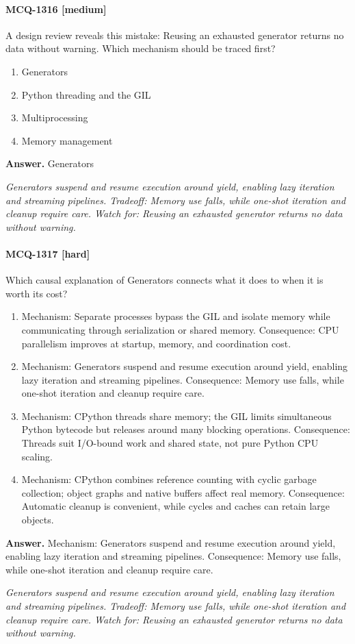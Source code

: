 \paragraph{MCQ-1316 [medium]} A design review reveals this mistake: Reusing an exhausted generator returns no data without warning. Which mechanism should be traced first?
\begin{enumerate}[label=\Alph*.]
\item Generators
\item Python threading and the GIL
\item Multiprocessing
\item Memory management
\end{enumerate}
\noindent\textbf{Answer.} Generators
\par\textit{Generators suspend and resume execution around yield, enabling lazy iteration and streaming pipelines. Tradeoff: Memory use falls, while one-shot iteration and cleanup require care. Watch for: Reusing an exhausted generator returns no data without warning.}
\paragraph{MCQ-1317 [hard]} Which causal explanation of Generators connects what it does to when it is worth its cost?
\begin{enumerate}[label=\Alph*.]
\item Mechanism: Separate processes bypass the GIL and isolate memory while communicating through serialization or shared memory. Consequence: CPU parallelism improves at startup, memory, and coordination cost.
\item Mechanism: Generators suspend and resume execution around yield, enabling lazy iteration and streaming pipelines. Consequence: Memory use falls, while one-shot iteration and cleanup require care.
\item Mechanism: CPython threads share memory; the GIL limits simultaneous Python bytecode but releases around many blocking operations. Consequence: Threads suit I/O-bound work and shared state, not pure Python CPU scaling.
\item Mechanism: CPython combines reference counting with cyclic garbage collection; object graphs and native buffers affect real memory. Consequence: Automatic cleanup is convenient, while cycles and caches can retain large objects.
\end{enumerate}
\noindent\textbf{Answer.} Mechanism: Generators suspend and resume execution around yield, enabling lazy iteration and streaming pipelines. Consequence: Memory use falls, while one-shot iteration and cleanup require care.
\par\textit{Generators suspend and resume execution around yield, enabling lazy iteration and streaming pipelines. Tradeoff: Memory use falls, while one-shot iteration and cleanup require care. Watch for: Reusing an exhausted generator returns no data without warning.}
